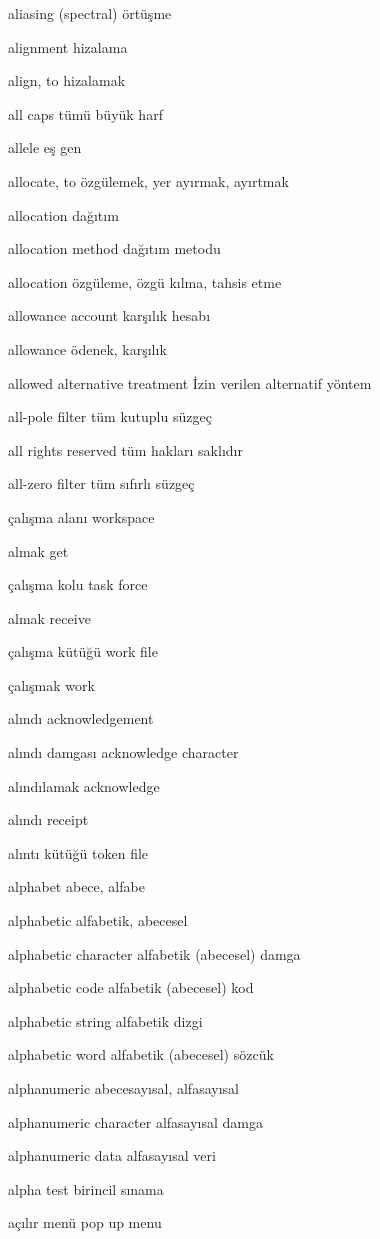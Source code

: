 \documentclass[12pt,fleqn]{article}\usepackage{../../common}
\begin{document}
aliasing (spectral) örtüşme

alignment hizalama

align, to hizalamak

all caps tümü büyük harf

allele eş gen

allocate, to özgülemek, yer ayırmak, ayırtmak

allocation dağıtım

allocation method dağıtım metodu

allocation özgüleme, özgü kılma, tahsis etme

allowance account karşılık hesabı

allowance ödenek, karşılık

allowed alternative treatment İzin verilen alternatif yöntem

all-pole filter tüm kutuplu süzgeç

all rights reserved tüm hakları saklıdır

all-zero filter tüm sıfırlı süzgeç

çalışma alanı workspace

almak get

çalışma kolu task force

almak receive

çalışma kütüğü work file

çalışmak work

alındı acknowledgement

alındı damgası acknowledge character

alındılamak acknowledge

alındı receipt

alıntı kütüğü token file

alphabet abece, alfabe

alphabetic alfabetik, abecesel

alphabetic character alfabetik (abecesel) damga

alphabetic code alfabetik (abecesel) kod

alphabetic string alfabetik dizgi

alphabetic word alfabetik (abecesel) sözcük

alphanumeric abecesayısal, alfasayısal

alphanumeric character alfasayısal damga

alphanumeric data alfasayısal veri

alpha test birincil sınama

açılır menü pop up menu
\end{document}
